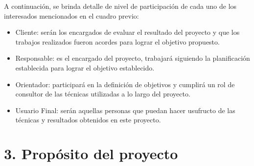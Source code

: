 \documentclass[
11pt, %
]{charter}
\begin{document}
%
%
%
%
% 
%

A continuación, se brinda detalle de nivel de participación de cada uno de los interesados mencionados en el cuadro previo:

\begin{itemize}
	\item Cliente: serán los encargados de evaluar el resultado del proyecto y que los trabajos realizados fueron acordes para lograr el objetivo propuesto. 
	\item Responsable: es el encargado del proyecto, trabajará siguiendo la planificación establecida para lograr el objetivo establecido.
	\item Orientador: participará en la definición de objetivos y cumplirá un rol de consultor de las técnicas utilizadas a lo largo del proyecto.
	\item Usuario Final: serán aquellas personas que puedan hacer usufructo de las técnicas y resultados obtenidos en este proyecto.
\end{itemize}

\section{3. Propósito del proyecto}
\label{sec:proposito}

%
\end{document}
